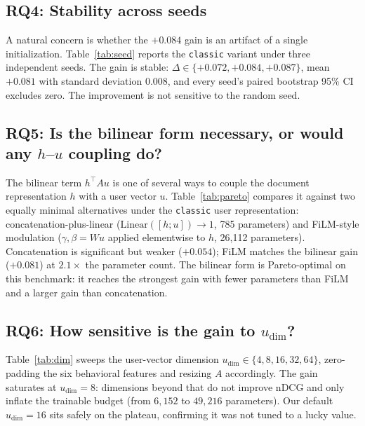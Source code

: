 \subsection{RQ4: Stability across seeds}
\label{sec:exp:seed}

A natural concern is whether the $+0.084$ gain is an artifact of a single initialization. Table~\ref{tab:seed} reports the \texttt{classic} variant under three independent seeds. The gain is stable: $\Delta \in \{+0.072, +0.084, +0.087\}$, mean $+0.081$ with standard deviation $0.008$, and every seed's paired bootstrap 95\% CI excludes zero. The improvement is not sensitive to the random seed.



\subsection{RQ5: Is the bilinear form necessary, or would any $h$--$u$ coupling do?}
\label{sec:exp:mech}

The bilinear term $h^\top A u$ is one of several ways to couple the document representation $h$ with a user vector $u$. Table~\ref{tab:pareto} compares it against two equally minimal alternatives under the \texttt{classic} user representation: concatenation-plus-linear ($\mathrm{Linear}([h;u]) \to 1$, 785 parameters) and FiLM-style modulation ($\gamma,\beta = Wu$ applied elementwise to $h$, 26{,}112 parameters). Concatenation is significant but weaker ($+0.054$); FiLM matches the bilinear gain ($+0.081$) at $2.1\times$ the parameter count. The bilinear form is Pareto-optimal on this benchmark: it reaches the strongest gain with fewer parameters than FiLM and a larger gain than concatenation.



\subsection{RQ6: How sensitive is the gain to $u_{\dim}$?}
\label{sec:exp:dim}

Table~\ref{tab:dim} sweeps the user-vector dimension $u_{\dim} \in \{4,8,16,32,64\}$, zero-padding the six behavioral features and resizing $A$ accordingly. The gain saturates at $u_{\dim}{=}8$: dimensions beyond that do not improve nDCG and only inflate the trainable budget (from $6{,}152$ to $49{,}216$ parameters). Our default $u_{\dim}{=}16$ sits safely on the plateau, confirming it was not tuned to a lucky value.


